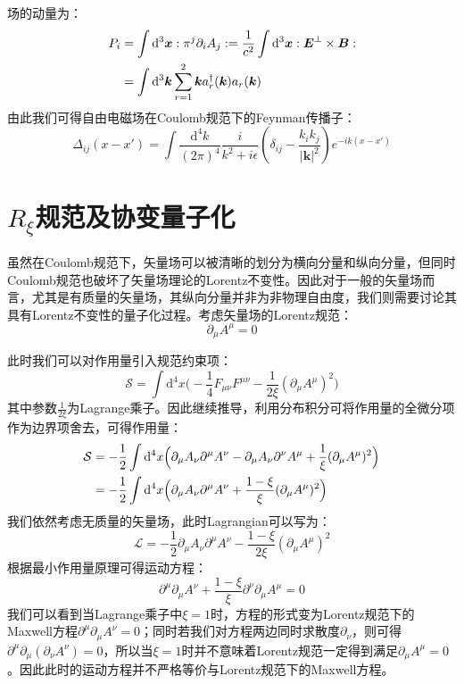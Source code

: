 场的动量为：
\begin{align}
P_i&=\int\mathrm{d}^3\boldsymbol{x}:\pi^j\partial_i A_j:=\frac{1}{c^2}\int\mathrm{d}^3\boldsymbol{x}:\boldsymbol{E}^{\bot}\times\boldsymbol{B}:\notag\\
&=\int\mathrm{d}^3\boldsymbol{k}\sum_{r=1}^{2}\boldsymbol{k}a^{\dagger}_r(\boldsymbol{k})a_r(\boldsymbol{k})
\end{align}
由此我们可得自由电磁场在Coulomb规范下的Feynman传播子：
\begin{equation}
\Delta_{ij}(x-x')=\int\frac{\mathrm{d}^4k}{(2\pi)^4}\frac{i}{k^2+i\epsilon}\left(\delta_{ij}-\frac{k_ik_j}{|\boldsymbol{k}|^2}\right)e^{-ik(x-x')}
\end{equation}
\section{$R_\xi$规范及协变量子化}
虽然在Coulomb规范下，矢量场可以被清晰的划分为横向分量和纵向分量，但同时Coulomb规范也破坏了矢量场理论的Lorentz不变性。因此对于一般的矢量场而言，尤其是有质量的矢量场，其纵向分量并非为非物理自由度，我们则需要讨论其具有Lorentz不变性的量子化过程。考虑矢量场的Lorentz规范：
\begin{equation}
\partial_\mu A^\mu=0
\end{equation}

此时我们可以对作用量引入规范约束项：
\begin{equation}
\mathcal{S}=\int\mathrm{d}^4x\Big(-\frac{1}{4}F_{\mu\nu}F^{\mu\nu}-\frac{1}{2\xi}(\partial_\mu A^\mu)^2 \Big)
\end{equation}
其中参数$\frac{1}{2\xi}$为Lagrange乘子。因此继续推导，利用分布积分可将作用量的全微分项作为边界项舍去，可得作用量：
\begin{align}
\mathcal{S}&=-\frac{1}{2}\int\mathrm{d}^4x\Big(\partial_\mu A_\nu \partial^\mu A^\nu-\partial_\mu A_\nu \partial^\nu A^\mu+\frac{1}{\xi}(\partial_\mu A^\mu)^2 \Big)\notag\\
&=-\frac{1}{2}\int\mathrm{d}^4x\Big(\partial_\mu A_\nu \partial^\mu A^\nu+\frac{1-\xi}{\xi}(\partial_\mu A^\mu)^2 \Big)
\end{align}
我们依然考虑无质量的矢量场，此时Lagrangian可以写为：
\begin{equation}
\mathscr{L}=-\frac{1}{2}\partial_\mu A_\nu \partial^\mu A^\nu-\frac{1-\xi}{2\xi}(\partial_\mu A^\mu)^2
\end{equation}
根据最小作用量原理可得运动方程：
\begin{equation}
\partial^\mu\partial_\mu A^\nu+\frac{1-\xi}{\xi}\partial^\nu\partial_\mu A^\mu=0
\label{eom1}
\end{equation}
我们可以看到当Lagrange乘子中$\xi=1$时，方程的形式变为Lorentz规范下的Maxwell方程$\partial^\mu\partial_\mu A^\nu=0$；同时若我们对方程两边同时求散度$\partial_\nu$，则可得$\partial^\mu\partial_\mu(\partial_\nu A^\nu)=0$，所以当$\xi=1$时并不意味着Lorentz规范一定得到满足$\partial_\mu A^\mu=0$。因此此时的运动方程并不严格等价与Lorentz规范下的Maxwell方程。

